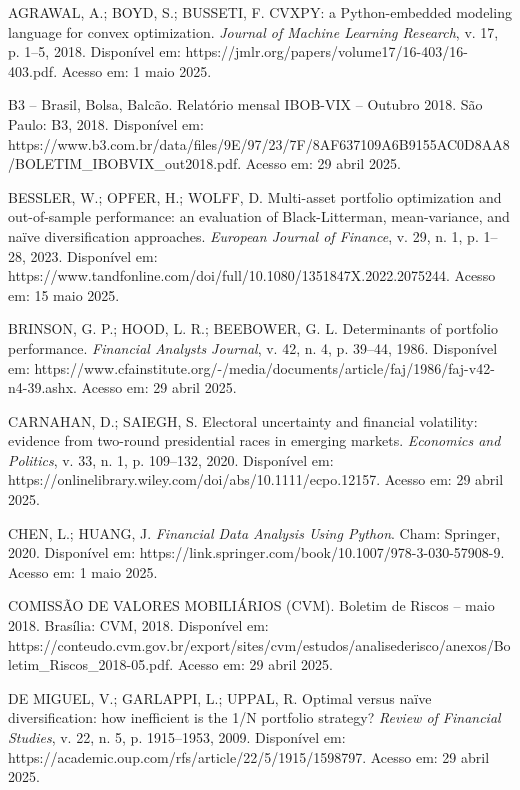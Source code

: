 \begin{thebibliography}{99}

AGRAWAL, A.; BOYD, S.; BUSSETI, F. CVXPY: a Python-embedded modeling language for convex optimization. \textit{Journal of Machine Learning Research}, v. 17, p. 1--5, 2018. Disponível em: https://jmlr.org/papers/volume17/16-403/16-403.pdf. Acesso em: 1 maio 2025.

B3 -- Brasil, Bolsa, Balcão. Relatório mensal IBOB-VIX -- Outubro 2018. São Paulo: B3, 2018. Disponível em: https://www.b3.com.br/data/files/9E/97/23/7F/8AF637109A6B9155AC0D8AA8/BOLETIM\_IBOBVIX\_out2018.pdf. Acesso em: 29 abril 2025.

BESSLER, W.; OPFER, H.; WOLFF, D. Multi-asset portfolio optimization and out-of-sample performance: an evaluation of Black-Litterman, mean-variance, and naïve diversification approaches. \textit{European Journal of Finance}, v. 29, n. 1, p. 1--28, 2023. Disponível em: https://www.tandfonline.com/doi/full/10.1080/1351847X.2022.2075244. Acesso em: 15 maio 2025.

BRINSON, G. P.; HOOD, L. R.; BEEBOWER, G. L. Determinants of portfolio performance. \textit{Financial Analysts Journal}, v. 42, n. 4, p. 39--44, 1986. Disponível em: https://www.cfainstitute.org/-/media/documents/article/faj/1986/faj-v42-n4-39.ashx. Acesso em: 29 abril 2025.

CARNAHAN, D.; SAIEGH, S. Electoral uncertainty and financial volatility: evidence from two-round presidential races in emerging markets. \textit{Economics and Politics}, v. 33, n. 1, p. 109--132, 2020. Disponível em: https://onlinelibrary.wiley.com/doi/abs/10.1111/ecpo.12157. Acesso em: 29 abril 2025.

CHEN, L.; HUANG, J. \textit{Financial Data Analysis Using Python}. Cham: Springer, 2020. Disponível em: https://link.springer.com/book/10.1007/978-3-030-57908-9. Acesso em: 1 maio 2025.

COMISSÃO DE VALORES MOBILIÁRIOS (CVM). Boletim de Riscos -- maio 2018. Brasília: CVM, 2018. Disponível em: https://conteudo.cvm.gov.br/export/sites/cvm/estudos/analisederisco/anexos/Boletim\_Riscos\_2018-05.pdf. Acesso em: 29 abril 2025.

DE MIGUEL, V.; GARLAPPI, L.; UPPAL, R. Optimal versus naïve diversification: how inefficient is the 1/N portfolio strategy? \textit{Review of Financial Studies}, v. 22, n. 5, p. 1915--1953, 2009. Disponível em: https://academic.oup.com/rfs/article/22/5/1915/1598797. Acesso em: 29 abril 2025.


\end{thebibliography}
